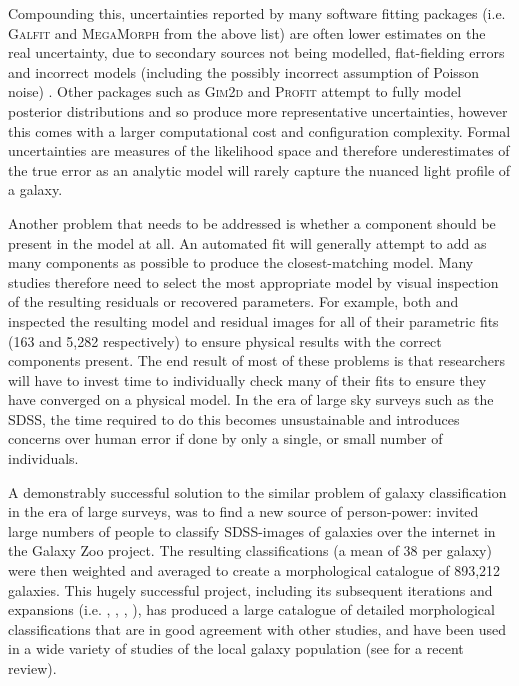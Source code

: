 \documentclass[trackchanges]{aastex63}
\begin{document}
Compounding this, uncertainties reported by many software fitting packages (i.e. \textsc{Galfit} and \textsc{MegaMorph} from the above list) are often lower estimates on the real uncertainty, due to secondary sources not being modelled, flat-fielding errors and incorrect models (including the possibly incorrect assumption of Poisson noise) \citep{2010AJ....139.2097P}. Other packages such as \textsc{Gim2d} and \textsc{Profit} attempt to fully model posterior distributions and so produce more representative uncertainties, however this comes with a larger computational cost and configuration complexity. Formal uncertainties are measures of the likelihood space and therefore underestimates of the true error as an analytic model will rarely capture the nuanced light profile of a galaxy.

Another problem that needs to be addressed is whether a component should be present in the model at all. An automated fit will generally attempt to add as many components as possible to produce the closest-matching model. Many studies therefore need to select the most appropriate model by  visual inspection of the resulting residuals or recovered parameters. For example, both \citet{Vika2014:1408.4070v1} and \citet{2018MNRAS.473.4731K} inspected the resulting model and residual images for all of their parametric fits (163 and 5,282 respectively) to ensure physical results with the correct components present. The end result of most of these problems is that researchers will have to invest time to individually check many of their fits to ensure they have converged on a physical model. In the era of large sky surveys such as the SDSS, the time required to do this becomes unsustainable and introduces concerns over human error if done by only a single, or small number of individuals.

A demonstrably successful solution to the similar problem of galaxy classification in the era of large surveys, was to find a new source of person-power: \cite{Lintott2008:0804.4483v1} invited large numbers of people to classify SDSS-images of galaxies over the internet in the Galaxy Zoo project. The resulting classifications (a mean of 38 per galaxy) were then weighted and averaged to create a morphological catalogue of 893,212 galaxies. This hugely successful project, including its subsequent iterations and expansions (i.e. \citealt{Willett2013:1308.3496v2}, \citealt{Hart2016:1607.01019v1}, \citealt{2017MNRAS.464.4176W}, \citealt{2017MNRAS.464.4420S}), has produced a large catalogue of detailed morphological classifications that are in good agreement with other studies, and have been used in a wide variety of studies of the local galaxy population (see \citealt{2019arXiv191008177M} for a recent review).
\end{document}
